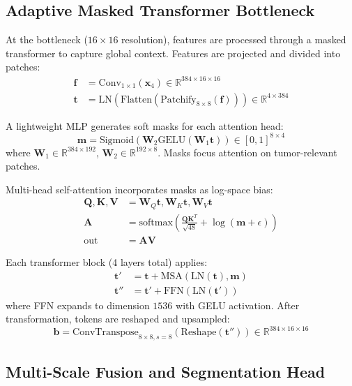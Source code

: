 \subsection{Adaptive Masked Transformer Bottleneck}

At the bottleneck ($16 \times 16$ resolution), features are processed through a masked transformer to capture global context. Features are projected and divided into patches:
\begin{align*}
\mathbf{f} &= \text{Conv}_{1\times1}(\mathbf{x}_4) \in \mathbb{R}^{384 \times 16 \times 16} \\
\mathbf{t} &= \text{LN}(\text{Flatten}(\text{Patchify}_{8 \times 8}(\mathbf{f}))) \in \mathbb{R}^{4 \times 384}
\end{align*}

A lightweight MLP generates soft masks for each attention head:
\[
\mathbf{m} = \text{Sigmoid}(\mathbf{W}_2 \text{GELU}(\mathbf{W}_1 \mathbf{t})) \in [0,1]^{8 \times 4}
\]
where $\mathbf{W}_1 \in \mathbb{R}^{384 \times 192}$, $\mathbf{W}_2 \in \mathbb{R}^{192 \times 8}$. Masks focus attention on tumor-relevant patches.

Multi-head self-attention incorporates masks as log-space bias:
\begin{align*}
\mathbf{Q}, \mathbf{K}, \mathbf{V} &= \mathbf{W}_Q\mathbf{t}, \mathbf{W}_K\mathbf{t}, \mathbf{W}_V\mathbf{t} \\
\mathbf{A} &= \text{softmax}\left(\frac{\mathbf{Q}\mathbf{K}^T}{\sqrt{48}} + \log(\mathbf{m} + \epsilon)\right) \\
\text{out} &= \mathbf{A}\mathbf{V}
\end{align*}

Each transformer block (4 layers total) applies:
\begin{align*}
\mathbf{t}' &= \mathbf{t} + \text{MSA}(\text{LN}(\mathbf{t}), \mathbf{m}) \\
\mathbf{t}'' &= \mathbf{t}' + \text{FFN}(\text{LN}(\mathbf{t}'))
\end{align*}
where FFN expands to dimension $1536$ with GELU activation. After transformation, tokens are reshaped and upsampled:
\[
\mathbf{b} = \text{ConvTranspose}_{8\times 8, s=8}(\text{Reshape}(\mathbf{t}'')) \in \mathbb{R}^{384 \times 16 \times 16}
\]

\subsection{Multi-Scale Fusion and Segmentation Head}

